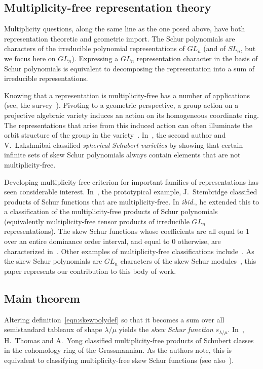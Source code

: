 \subsection{Multiplicity-free representation theory} Multiplicity questions, along the same line as the one posed above, have both representation theoretic and geometric import. The Schur polynomials are characters of the irreducible polynomial representations of $GL_n$ (and of $SL_n$, but we focus here on $GL_n$). Expressing a $GL_n$ representation character in the basis of Schur polynomials is equivalent to decomposing the representation into a sum of irreducible representations. 

Knowing that a representation is multiplicity-free has a number of applications (see, \eg the survey~\cite{H95}). Pivoting to a geometric perspective, a group action on a projective algebraic variety induces an action on its homogeneous coordinate ring. The representations that arise from this induced action can often illuminate the orbit structure of the group in the variety~\cite{AP14,MWZ01,P14,S03}. In~\cite{HL19}, the second author and V.~Lakshmibai classified \emph{spherical Schubert varieties} by showing that certain infinite sets of skew Schur polynomials always contain elements that are not multiplicity-free. 

Developing multiplicity-free criterion for important families of representations has seen considerable interest. In~\cite{S01}, the prototypical example, J.~Stembridge classified products of Schur functions that are multiplicity-free. In \emph{ibid.}, he extended this to a classification of the multiplicity-free products of Schur polynomials (equivalently multiplicity-free tensor products of irreducible $GL_n$ representations). The skew Schur functions whose coefficients are all equal to $1$ over an entire dominance order interval, and equal to $0$ otherwise, are characterized in~\cite{ACM19}. Other examples of multiplicity-free classifications include~\cite{FMS19,G10,TY10}. As the skew Schur polynomials are $GL_n$ characters of the skew Schur modules~\cite{FH91}, this paper represents our contribution to this body of work. 

\subsection{Main theorem} Altering definition~\eqref{eqn:skewpolydef} so that it becomes a sum over all semistandard tableaux of shape $\lambda / \mu$ yields the \emph{skew Schur function} $s_{\lambda / \mu}$. In~\cite{TY10}, H.~Thomas and A.~Yong classified multiplicity-free products of Schubert classes in the cohomology ring of the Grassmannian. As the authors note, this is equivalent to classifying multiplicity-free skew Schur functions (see also~\cite{G10}). 

